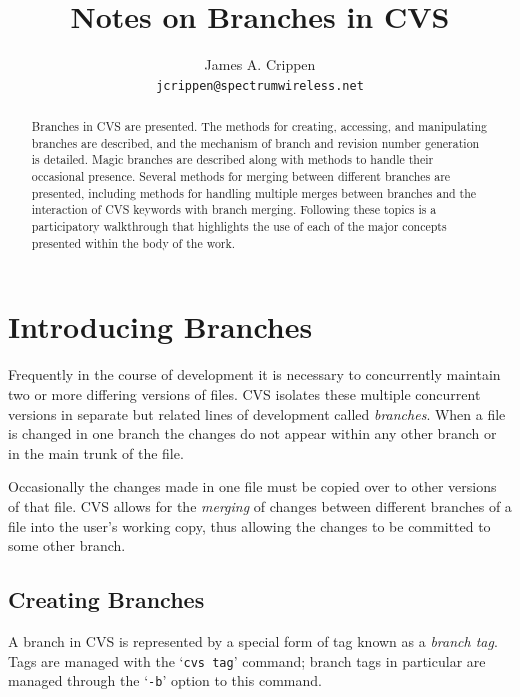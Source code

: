 \documentclass[12pt,letterpaper]{article}
\title{Notes on Branches in CVS}
\author{James A. Crippen\\
        \texttt{jcrippen@spectrumwireless.net}}
\newcommand{\cmd}[1]{`\texttt{#1}'}
\begin{document}
\maketitle

\begin{abstract}
  Branches in CVS are presented.  The methods for creating, accessing, and
  manipulating branches are described, and the mechanism of branch and
  revision number generation is detailed.  Magic branches are described along
  with methods to handle their occasional presence.  Several methods for
  merging between different branches are presented, including methods for
  handling multiple merges between branches and the interaction of CVS
  keywords with branch merging.  Following these topics is a participatory
  walkthrough that highlights the use of each of the major concepts presented
  within the body of the work.
\end{abstract}

\tableofcontents

\listoffigures




\section{Introducing Branches}

Frequently in the course of development it is necessary to concurrently
maintain two or more differing versions of files.  CVS isolates these multiple
concurrent versions in separate but related lines of development called
\emph{branches}.  When a file is changed in one branch the changes do not
appear within any other branch or in the main trunk of the file.

Occasionally the changes made in one file must be copied over to other
versions of that file.  CVS allows for the \emph{merging} of changes between
different branches of a file into the user's working copy, thus allowing the
changes to be committed to some other branch.

\subsection{Creating Branches}

A branch in CVS is represented by a special form of tag known as a
\emph{branch tag}.  Tags are managed with the \cmd{cvs tag} command; branch
tags in particular are managed through the \cmd{-b} option to this command.
\end{document}
